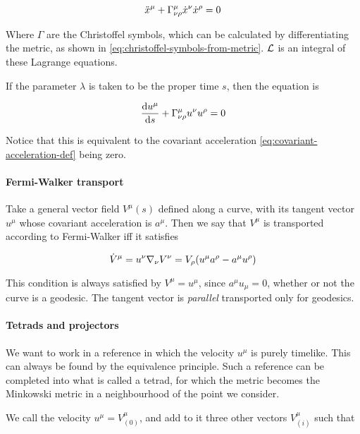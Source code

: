 \documentclass[main.tex]{subfiles}
\begin{document}
\begin{equation}
    \Ddot{x}^\mu + \Gamma^\mu_{\nu\rho} \Dot{x}^\nu \Dot{x}^\rho = 0
\end{equation}

Where $\Gamma$ are the Christoffel symbols, which can be calculated by differentiating the metric, as shown in \eqref{eq:christoffel-symbols-from-metric}. $\mathcal{L}$ is an integral of these Lagrange equations.

If the parameter $\lambda$ is taken to be the proper time $s$, then the equation is

\begin{equation}
    \dv{u^\mu}{s} + \Gamma^\mu _{\nu\rho} u^\nu u^\rho = 0
\end{equation}

Notice that this is equivalent to the covariant acceleration \eqref{eq:covariant-acceleration-def} being zero.

\paragraph{Fermi-Walker transport}

Take a general vector field \(V ^{\mu} (s)\) defined along a curve, with its tangent vector \(u^\mu\) whose covariant acceleration is \(a^\mu\).
Then we say that \(V^\mu\) is transported according to Fermi-Walker iff it satisfies

\begin{equation}
    \dot{V}^\mu  = u^\nu \nabla_\nu V^\nu
    = V_\rho \qty(u^\mu a^\rho - a^\mu u^\rho)
\end{equation}

This condition is always satisfied by \(V^\mu = u^\mu\), since \(a^\mu u_\mu = 0\), whether or not the curve is a geodesic. The tangent vector is \emph{parallel} transported only for geodesics.

\paragraph{Tetrads and projectors}

We want to work in a reference in which the velocity $u^\mu$ is purely timelike. This can always be found by the equivalence principle. Such a reference can be completed into what  is called a tetrad, for which the metric becomes the Minkowski metric in a neighbourhood of the point we consider.

We call the velocity \(u^\mu = V^\mu _{(0)}\), and add to it three other vectors \(V^\mu_{(i)}\) such that
\end{document}
